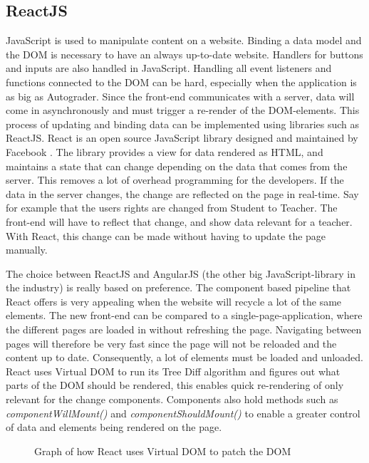 
\subsection{ReactJS}
JavaScript is used to manipulate content on a website. Binding a data model and the DOM is necessary to have an always up-to-date website. Handlers for buttons and inputs are also handled in JavaScript. Handling all event listeners and functions connected to the DOM can be hard, especially when the application is as big as Autograder. Since the front-end communicates with a server, data will come in asynchronously and must trigger a re-render of the DOM-elements. This process of updating and binding data can be implemented using libraries such as ReactJS. React is an open source JavaScript library designed and maintained by Facebook . The library provides a view for data rendered as HTML, and maintains a state that can change depending on the data that comes from the server. This removes a lot of overhead programming for the developers. If the data in the server changes, the change are reflected on the page in real-time. Say for example that the users rights are changed from Student to Teacher. The front-end will have to reflect that change, and show data relevant for a teacher. With React, this change can be made without having to update the page manually. 

The choice between ReactJS and AngularJS (the other big JavaScript-library in the industry) is really based on preference. The component based pipeline that React offers is very appealing when the website will recycle a lot of the same elements. The new front-end can be compared to a single-page-application, where the different pages are loaded in without refreshing the page. Navigating between pages will therefore be very fast since the page will not be reloaded and the content up to date. Consequently, a lot of elements must be loaded and unloaded. React uses Virtual DOM to run its Tree Diff algorithm and figures out what parts of the DOM should be rendered, this enables quick re-rendering of only relevant for the change components. Components also hold methods such as \emph{componentWillMount()} and \emph{componentShouldMount()} to enable a greater control of data and elements being rendered on the page.

\begin{figure}[h]
\centering
{}
\caption{Graph of how React uses Virtual DOM to patch the DOM}
\end{figure}

